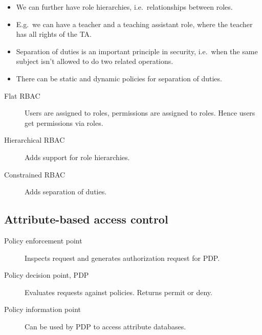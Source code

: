 \begin{frame}
  \begin{itemize}
    \item We can further have role hierarchies, i.e.\ relationships between 
      roles.

    \item E.g.\ we can have a teacher and a teaching assistant role, where the 
      teacher has all rights of the TA\@.

    \item Separation of duties is an important principle in security, i.e.\ 
      when the same subject isn't allowed to do two related operations.

    \item There can be static and dynamic policies for separation of duties.

  \end{itemize}
\end{frame}

\begin{frame}
  \begin{description}
    \item[Flat RBAC] Users are assigned to roles, permissions are assigned to 
      roles.
      Hence users get permissions via roles.

    \item[Hierarchical RBAC]
      Adds support for role hierarchies.

    \item[Constrained RBAC]
      Adds separation of duties.
  \end{description}
\end{frame}

\subsection{Attribute-based access control}

\begin{frame}
  \begin{definition}
    \begin{description}
      \item[Policy enforcement point] Inspects request and generates 
        authorization request for PDP.
      \item[Policy decision point, PDP] Evaluates requests against policies.
        Returns permit or deny.
      \item[Policy information point] Can be used by PDP to access attribute 
        databases.
    \end{description}
  \end{definition}
\end{frame}

